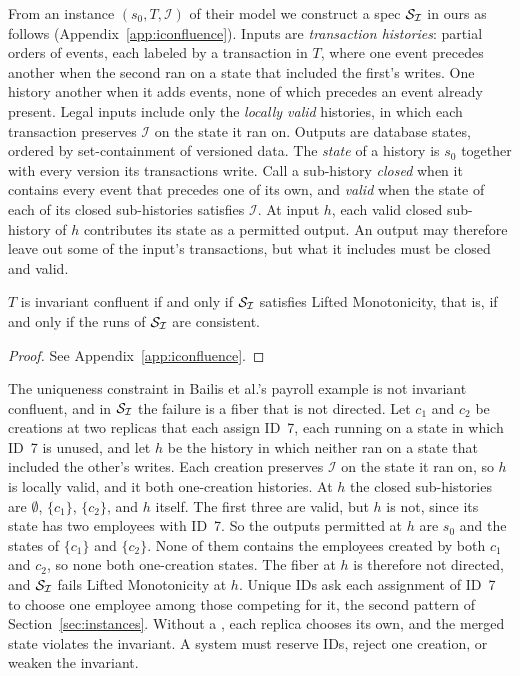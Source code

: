 From an instance $(s_0,T,\mathcal I)$ of their model we construct a
spec $\mathcal{S}_{\mathcal I}$ in ours as follows (Appendix~\ref{app:iconfluence}).
Inputs are \emph{transaction histories}: partial orders of events, each
labeled by a transaction in $T$, where one event precedes another when the
second ran on a state that included the first's writes.  One history \inrel
another when it adds events, none of which precedes an event already present.
Legal inputs include only the \emph{locally valid} histories, in which each
transaction preserves $\mathcal I$ on the state it ran on.  Outputs are
database states, ordered by set-containment of versioned data.  The
\emph{state} of a history is $s_0$ together with every version its
transactions write.  Call a sub-history \emph{closed} when it contains every
event that precedes one of its own, and \emph{valid} when the state of each of
its closed sub-histories satisfies $\mathcal I$.  At input $h$, each valid
closed sub-history of $h$ contributes its state as a permitted output.  An
output may therefore leave out some of the input's transactions, but what it
includes must be closed and valid.

\begin{proposition}
\label{prop:iconfluence-lm}
$T$ is invariant confluent if and only if $\mathcal{S}_{\mathcal I}$ satisfies Lifted
Monotonicity, that is, if and only if the runs of $\mathcal{S}_{\mathcal I}$ are consistent.
\end{proposition}

\begin{proof}
See Appendix~\ref{app:iconfluence}.
\end{proof}

The uniqueness constraint in Bailis et al.'s payroll example is not invariant
confluent, and in $\mathcal{S}_{\mathcal I}$ the failure is a fiber that is not
directed.  Let $c_1$ and $c_2$ be creations at two replicas that each assign
ID~7, each running on a state in which ID~7 is unused, and let $h$ be the
history in which neither ran on a state that included the other's writes.
Each creation preserves $\mathcal I$ on the state it ran on, so $h$ is locally
valid, and it \inrel both one-creation histories.  At $h$ the closed
sub-histories are $\emptyset$, $\{c_1\}$, $\{c_2\}$, and $h$ itself.  The first
three are valid, but $h$ is not, since its state has two employees with ID~7.
So the outputs permitted at $h$ are $s_0$ and the states of $\{c_1\}$ and
$\{c_2\}$.  None of them contains the employees created by both $c_1$ and
$c_2$, so none \outrel both one-creation states.  The fiber at $h$ is therefore
not directed, and $\mathcal{S}_{\mathcal I}$ fails Lifted Monotonicity at $h$.  Unique IDs
ask each assignment of ID~7 to choose one employee among those competing for
it, the second pattern of Section~\ref{sec:instances}.  Without a
\commitment, each replica chooses its own, and the merged state violates the
invariant.  A
system must reserve IDs, reject one creation, or weaken the invariant.

